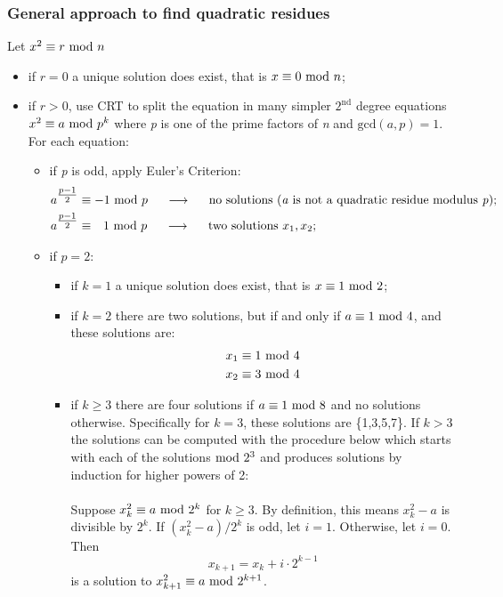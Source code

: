 \subsubsection{General approach to find quadratic residues}
Let $x^2\equiv r\text{ mod } n$
\begin{itemize}
    \item if $r=0$ a unique solution does exist, that is $x\equiv0\text{ mod } n$;
    \item if $r>0$, use CRT to split the equation in many simpler $2^{\text{nd}}$ degree equations $x^2\equiv a \text{ mod } p^k$ where \textit{p} is one of the prime factors of \textit{n} and $\text{gcd}(a,p)=1$. For each equation:
    \begin{itemize}
        \item if \textit{p} is odd, apply Euler's Criterion:
        \begin{alignat*}{2}
            & a^{\tfrac{p-1}{2}}\equiv -1\text{ mod } p\hspace{0.5cm}\longrightarrow\hspace{0.5cm}\text{no solutions (\textit{a} is not a quadratic residue modulus \textit{p})};\\
            & a^{\tfrac{p-1}{2}}\equiv\;\;\, 1\text{ mod } p\hspace{0.5cm}\longrightarrow\hspace{0.5cm}\text{two solutions } x_1,x_2;
        \end{alignat*}
        \item if $p=2$:
        \begin{itemize}
            \item if $k=1$ a unique solution does exist, that is $x\equiv1\text{ mod }2$;
            \item if $k=2$ there are two solutions, but if and only if $a\equiv1\text{ mod }4$, and these solutions are:
            \begin{alignat*}{2}
                &x_1\equiv1\text{ mod }4\\
                &x_2\equiv3\text{ mod }4
            \end{alignat*}
            \item if $k\ge3$ there are four solutions if $a\equiv1\text{ mod }8$ and no solutions otherwise. Specifically for $k=3$, these solutions are \{1,3,5,7\}. If $k>3$ the solutions can be computed with the procedure below which starts with each of the solutions$\text{ mod }2^3$ and produces solutions by induction for higher powers of 2:\\\\
            Suppose $x_k^2\equiv a\text{ mod }2^k$ for $k\ge3$. By definition, this means $x_k^2-a$ is divisible by $2^k$. If $(x_k^2-a)/2^k$ is odd, let $i=1$. Otherwise, let $i=0$. Then
            $$x_{k+1}=x_k+i\cdot2^{k-1}$$
            is a solution to $x_{k+1}^2\equiv a\text{ mod }2^{k+1}$.\\\\

\end{itemize}
\end{itemize}
\end{itemize}
